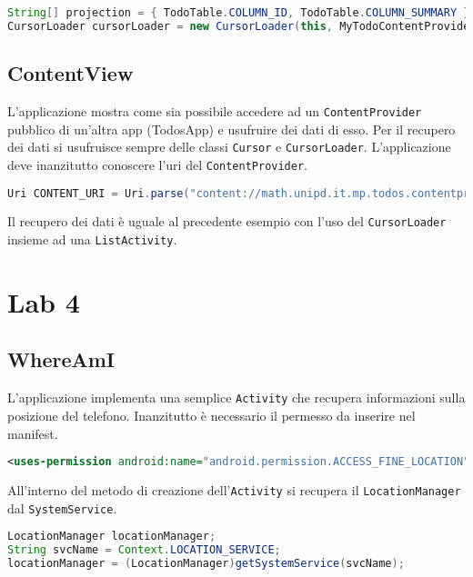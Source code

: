 \begin{lstlisting}[language=Java]
String[] projection = { TodoTable.COLUMN_ID, TodoTable.COLUMN_SUMMARY };
CursorLoader cursorLoader = new CursorLoader(this, MyTodoContentProvider.CONTENT_URI, projection, null, null, null);
\end{lstlisting}


\subsection{ContentView}

L'applicazione mostra come sia possibile accedere ad un
\lstinline|ContentProvider| pubblico di un'altra app (TodosApp) e usufruire dei
dati di esso. Per il recupero dei dati si usufruisce sempre delle classi
\lstinline|Cursor| e \lstinline|CursorLoader|.
L'applicazione deve inanzitutto conoscere l'uri del \lstinline|ContentProvider|.
\begin{lstlisting}[language=Java]
Uri CONTENT_URI = Uri.parse("content://math.unipd.it.mp.todos.contentprovider/todos");
\end{lstlisting}
Il recupero dei dati è uguale al precedente esempio con l'uso del
\lstinline|CursorLoader| insieme ad una \lstinline|ListActivity|.

\section{Lab 4}

\subsection{WhereAmI}

L'applicazione implementa una semplice \lstinline|Activity| che recupera informazioni sulla posizione del telefono. Inanzitutto è necessario il permesso da inserire nel manifest.

\begin{lstlisting}[language=XML]
<uses-permission android:name="android.permission.ACCESS_FINE_LOCATION"/>
\end{lstlisting}

All'interno del metodo di creazione dell'\lstinline|Activity| si recupera il \lstinline|LocationManager| dal \lstinline|SystemService|.

\begin{lstlisting}[language=Java]
LocationManager locationManager;
String svcName = Context.LOCATION_SERVICE;
locationManager = (LocationManager)getSystemService(svcName);
\end{lstlisting}

